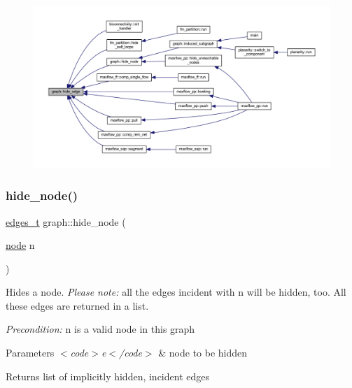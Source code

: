 \begin{figure}[H]
\begin{center}
\leavevmode
\includegraphics[width=350pt]{classgraph_ab2f8520bcac080d73c55228fecc61825_icgraph}
\end{center}
\end{figure}
\mbox{\label{classgraph_a214618b5e3c02695779350532506e225}} 
\subsubsection{\texorpdfstring{hide\+\_\+node()}{hide\_node()}}
{\footnotesize\ttfamily \mbox{\hyperlink{edge_8h_a8f9587479bda6cf612c103494b3858e3}{edges\+\_\+t}} graph\+::hide\+\_\+node (\begin{DoxyParamCaption}\item[{\mbox{\hyperlink{classnode}{node}}}]{n }\end{DoxyParamCaption})\hspace{0.3cm}{\ttfamily [inherited]}}

Hides a node. {\itshape Please note\+:} all the edges incident with {\ttfamily n} will be hidden, too. All these edges are returned in a list.

{\itshape Precondition\+:} {\ttfamily n} is a valid node in this graph


\begin{DoxyParams}{Parameters}
{\em $<$code$>$e$<$/code$>$} & node to be hidden \\
\hline
\end{DoxyParams}
\begin{DoxyReturn}{Returns}
list of implicitly hidden, incident edges 
\end{DoxyReturn}


